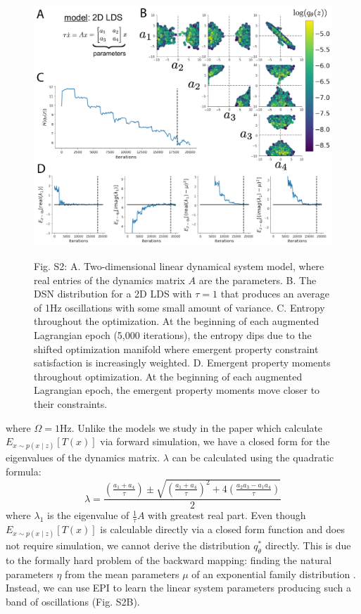 \documentclass[11pt]{article}
\begin{document}
\begin{figure}
\begin{center}
\includegraphics[scale=0.5]{figures/figS2/figS2.pdf}
\end{center}
\begin{flushleft}
Fig. S2: A. Two-dimensional linear dynamical system model, where real entries of the dynamics matrix $A$ are the parameters.  B. The DSN distribution for a 2D LDS with $\tau=1$ that produces an average of 1Hz oscillations with some small amount of variance.  C. Entropy throughout the optimization.  At the beginning of each augmented Lagrangian epoch (5,000 iterations), the entropy dips due to the shifted optimization manifold where emergent property constraint satisfaction is increasingly weighted.  D. Emergent property moments throughout optimization.  At the beginning of each augmented Lagrangian epoch, the emergent property moments move closer to their constraints.
\end{flushleft}
\end{figure}

where $\Omega = 1$Hz.  Unlike the models we study in the paper which calculate $E_{x \sim p(x \mid z)} \left[T(x) \right]$ via forward simulation, we have a closed  form for the eigenvalues of the dynamics matrix.  $\lambda$ can be calculated using the quadratic formula: 
\begin{equation}
\lambda = \frac{(\frac{a_1 + a_4}{\tau}) \pm \sqrt{(\frac{a_1+a_4}{\tau})^2 + 4(\frac{a_2 a_3 - a_1 a_4}{\tau})}}{2}
\end{equation}
where $\lambda_1$ is the eigenvalue of $\frac{1}{\tau}A$ with greatest real part.  Even though $E_{x\sim p(x \mid z)}\left[T(x)\right]$ is calculable directly via a closed form function and does not require simulation, we cannot derive the distribution $q^*_\theta$ directly.  This is due to the formally hard problem of the backward mapping: finding the natural parameters $\eta$ from the mean parameters $\mu$ of an exponential family distribution \cite{wainwright2008graphical}.  Instead, we can use EPI to learn the linear system parameters producing such a band of oscillations (Fig. S2B). 
\end{document}
